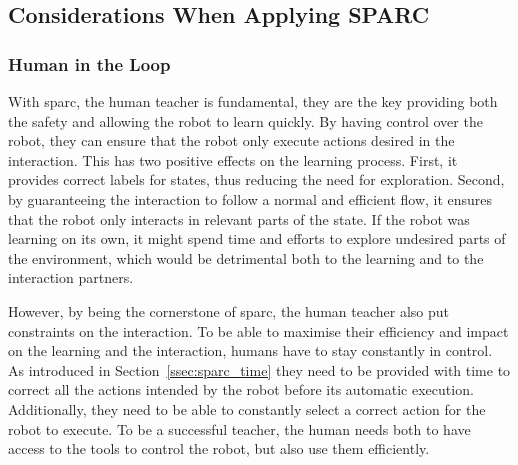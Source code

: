 

\subsection{Considerations When Applying SPARC}

\subsubsection{Human in the Loop}\label{sec:tuto_loop}
%
%
%
%

With sparc, the human teacher is fundamental, they are the key providing both the safety and allowing the robot to learn quickly. By having control over the robot, they can ensure that the robot only execute actions desired in the interaction. This has two positive effects on the learning process. First, it provides correct labels for states, thus reducing the need for exploration. Second, by guaranteeing the interaction to follow a normal and efficient flow, it ensures that the robot only interacts in relevant parts of the state. If the robot was learning on its own, it might spend time and efforts to explore undesired parts of the environment, which would be detrimental both to the learning and to the interaction partners.

However, by being the cornerstone of \gls{sparc}, the human teacher also put constraints on the interaction. To be able to maximise their efficiency and impact on the learning and the interaction, humans have to stay constantly in control. As introduced in Section~\ref{ssec:sparc_time} they need to be provided with time to correct all the actions intended by the robot before its automatic execution. Additionally, they need to be able to constantly select a correct action for the robot to execute. To be a successful teacher, the human needs both to have access to the tools to control the robot, but also use them efficiently.

